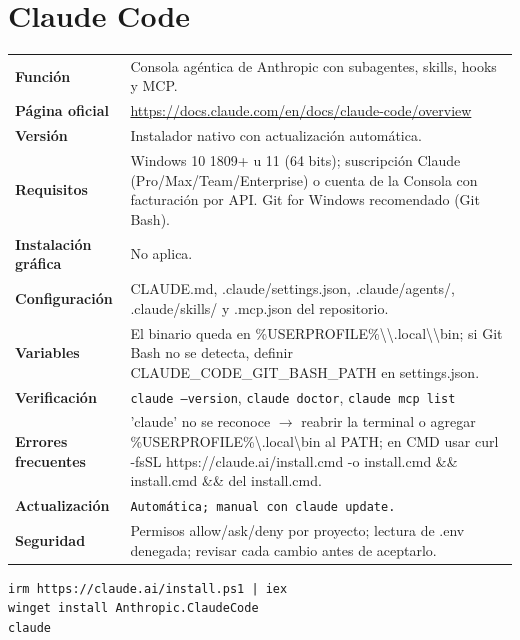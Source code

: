\section{Claude Code}
{\small\begin{tabularx}{\linewidth}{@{}>{\bfseries}p{2.9cm}X@{}}\toprule
Función & Consola agéntica de Anthropic con subagentes, skills, hooks y MCP.\\
Página oficial & \url{https://docs.claude.com/en/docs/claude-code/overview}\\
Versión & Instalador nativo con actualización automática.\\
Requisitos & Windows 10 1809+ u 11 (64 bits); suscripción Claude (Pro/Max/Team/Enterprise) o cuenta de la Consola con facturación por API. Git for Windows recomendado (Git Bash).\\
Instalación gráfica & No aplica.\\
Configuración & CLAUDE.md, .claude/settings.json, .claude/agents/, .claude/skills/ y .mcp.json del repositorio.\\
Variables & El binario queda en \%USERPROFILE\%\textbackslash{}\textbackslash{}.local\textbackslash{}\textbackslash{}bin; si Git Bash no se detecta, definir CLAUDE\_CODE\_GIT\_BASH\_PATH en settings.json.\\
Verificación & \texttt{claude --version}, \texttt{claude doctor}, \texttt{claude mcp list}\\
Errores frecuentes & 'claude' no se reconoce $\rightarrow$ reabrir la terminal o agregar \%USERPROFILE\%\textbackslash{}.local\textbackslash{}bin al PATH; en CMD usar curl -fsSL https://claude.ai/install.cmd -o install.cmd \&\& install.cmd \&\& del install.cmd.\\
Actualización & \texttt{Automática; manual con claude update.}\\
Seguridad & Permisos allow/ask/deny por proyecto; lectura de .env denegada; revisar cada cambio antes de aceptarlo.\\
\bottomrule\end{tabularx}}
\begin{lstlisting}[style=ps]
irm https://claude.ai/install.ps1 | iex
winget install Anthropic.ClaudeCode
claude
\end{lstlisting}

